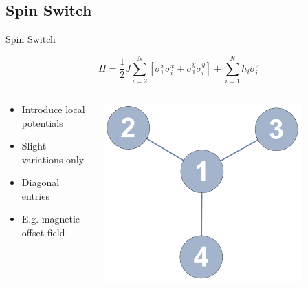 \documentclass{beamer}
\begin{document}
\subsection{Spin Switch}
\begin{frame}[t]{Spin Switch}
	\begin{exampleblock}{}
	\setlength\abovedisplayskip{-8pt}
	\begin{center}
		\[ H = \frac{1}{2}J\sum_{i=2}^{N}\left[\sigma_1^x\sigma_i^x + \sigma_1^y\sigma_i^y\right] + \sum_{i=1}^{N}h_i\sigma_i^z \]
	\end{center}
	\end{exampleblock}
	\begin{columns}[T]
		\begin{column}{0.5\textwidth}
			\centering
   			\begin{itemize}
				\item Introduce local potentials
				\item Slight variations only
				\item Diagonal entries 
				\item E.g. magnetic offset field
			\end{itemize}
		\end{column}
		\begin{column}{0.5\textwidth}
			\centering
    		\includegraphics[trim=0mm 0 0 0mm, width=0.8\textwidth]{Images/switch_labeled}
		\end{column}
	\end{columns}
\end{frame}
\end{document}
